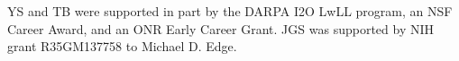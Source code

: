 YS and TB were supported in part by the DARPA I2O LwLL program, an NSF Career Award, and an ONR Early Career Grant. JGS was supported by NIH grant R35GM137758 to Michael D. Edge. 